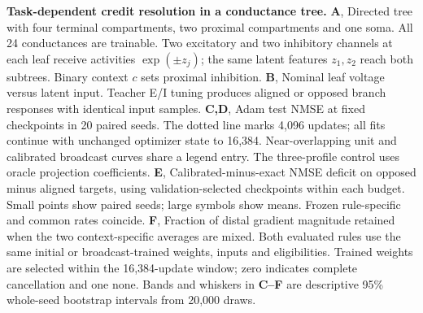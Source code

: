 \caption{\textbf{Task-dependent credit resolution in a conductance tree.}
\textbf{A}, Directed tree with four terminal compartments, two proximal
compartments and one soma. All 24 conductances are trainable. Two excitatory
and two inhibitory channels at each leaf receive activities
$\exp(\pm z_j)$; the same latent features $z_1,z_2$ reach both subtrees.
Binary context $c$ sets proximal inhibition.
\textbf{B}, Nominal leaf voltage versus latent input. Teacher E/I tuning
produces aligned or opposed branch responses with identical input samples.
\textbf{C,D}, Adam test NMSE at fixed checkpoints in 20 paired seeds.
The dotted line marks 4,096 updates; all fits continue with unchanged
optimizer state to 16,384. Near-overlapping unit and calibrated broadcast
curves share a legend entry. The three-profile control uses oracle
projection coefficients.
\textbf{E}, Calibrated-minus-exact NMSE deficit on opposed minus aligned
targets, using validation-selected checkpoints within each budget.
Small points show paired seeds; large symbols show means. Frozen
rule-specific and common rates coincide.
\textbf{F}, Fraction of distal gradient magnitude retained when the two
context-specific averages are mixed. Both evaluated rules use the same
initial or broadcast-trained weights, inputs and eligibilities. Trained
weights are selected within the 16,384-update window; zero indicates
complete cancellation and one none. Bands and whiskers in
\textbf{C--F} are descriptive 95\% whole-seed bootstrap intervals from
20,000 draws.}
